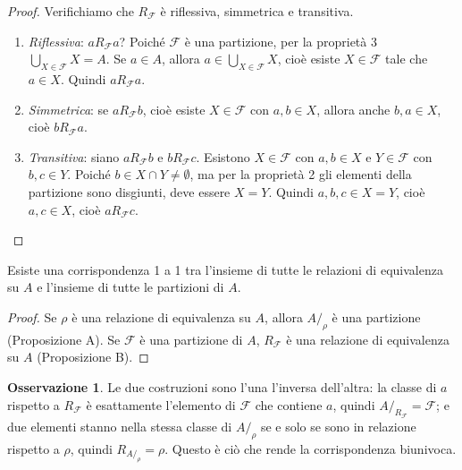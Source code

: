 \documentclass[11pt,a4paper]{article}
\theoremstyle{definition}
\newtheorem*{osservazione}{Osservazione}
\begin{document}
\begin{proof}
Verifichiamo che $R_\mathcal{F}$ è riflessiva, simmetrica e transitiva.
\begin{enumerate}
    \item \emph{Riflessiva}: $a \mathrel{R_\mathcal{F}} a$? Poiché
          $\mathcal{F}$ è una partizione, per la proprietà 3
          $\bigcup_{X \in \mathcal{F}} X = A$. Se $a \in A$, allora
          $a \in \bigcup_{X \in \mathcal{F}} X$, cioè esiste
          $X \in \mathcal{F}$ tale che $a \in X$. Quindi
          $a \mathrel{R_\mathcal{F}} a$.
    \item \emph{Simmetrica}: se $a \mathrel{R_\mathcal{F}} b$, cioè esiste
          $X \in \mathcal{F}$ con $a, b \in X$, allora anche
          $b, a \in X$, cioè $b \mathrel{R_\mathcal{F}} a$.
    \item \emph{Transitiva}: siano $a \mathrel{R_\mathcal{F}} b$ e
          $b \mathrel{R_\mathcal{F}} c$. Esistono $X \in \mathcal{F}$ con
          $a, b \in X$ e $Y \in \mathcal{F}$ con $b, c \in Y$. Poiché
          $b \in X \cap Y \neq \emptyset$, ma per la proprietà 2 gli
          elementi della partizione sono disgiunti, deve essere $X = Y$.
          Quindi $a, b, c \in X = Y$, cioè $a, c \in X$, cioè
          $a \mathrel{R_\mathcal{F}} c$. \qedhere
\end{enumerate}
\end{proof}

\begin{teorema}
Esiste una corrispondenza 1 a 1 tra l'insieme di tutte le relazioni di
equivalenza su $A$ e l'insieme di tutte le partizioni di $A$.
\end{teorema}

\begin{proof}
Se $\rho$ è una relazione di equivalenza su $A$, allora $A/_\rho$ è una
partizione (Proposizione A). Se $\mathcal{F}$ è una partizione di $A$,
$R_\mathcal{F}$ è una relazione di equivalenza su $A$ (Proposizione B).
\end{proof}

\begin{osservazione}
Le due costruzioni sono l'una l'inversa dell'altra: la classe di $a$
rispetto a $R_\mathcal{F}$ è esattamente l'elemento di $\mathcal{F}$ che
contiene $a$, quindi $A/_{R_\mathcal{F}} = \mathcal{F}$; e due elementi
stanno nella stessa classe di $A/_\rho$ se e solo se sono in relazione
rispetto a $\rho$, quindi $R_{A/_\rho} = \rho$. Questo è ciò che rende la
corrispondenza biunivoca.
\end{osservazione}
\end{document}
